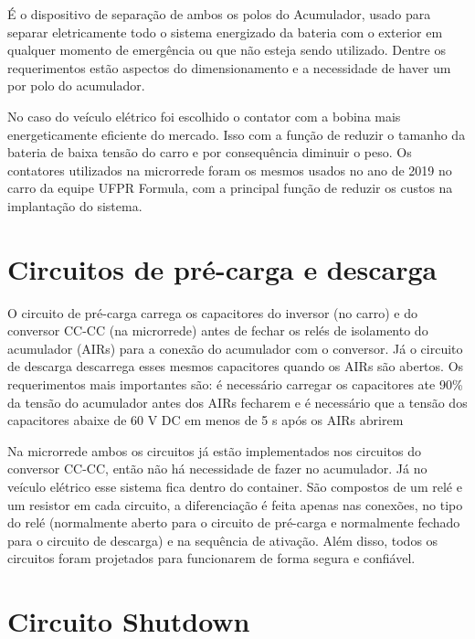     É o dispositivo de separação de ambos os polos do Acumulador, usado para separar eletricamente todo o sistema energizado da bateria com o exterior em qualquer momento de emergência ou que não esteja sendo utilizado. Dentre os requerimentos estão aspectos do dimensionamento e a necessidade de haver um por polo do acumulador.

    No caso do veículo elétrico foi escolhido o contator com a bobina mais energeticamente eficiente do mercado. Isso com a função de reduzir o tamanho da bateria de baixa tensão do carro e por consequência diminuir o peso. Os contatores utilizados na microrrede foram os mesmos usados no ano de 2019 no carro da equipe UFPR Formula, com a principal função de reduzir os custos na implantação do sistema.


\section{Circuitos de pré-carga e descarga}

    O circuito de pré-carga carrega os capacitores do inversor (no carro) e do conversor CC-CC (na microrrede) antes de fechar os relés de isolamento do acumulador (AIRs) para a conexão do acumulador com o conversor. Já o circuito de descarga descarrega esses mesmos capacitores quando os AIRs são abertos. Os requerimentos mais importantes são: é necessário carregar os capacitores ate 90\% da tensão do acumulador antes dos AIRs fecharem e é necessário que a tensão dos capacitores abaixe de 60 V DC em menos de 5 s após os AIRs abrirem

    Na microrrede ambos os circuitos já estão implementados nos circuitos do conversor CC-CC, então não há necessidade de fazer no acumulador. Já no veículo elétrico esse sistema fica dentro do container. São compostos de um relé e um resistor em cada circuito, a diferenciação é feita apenas nas conexões, no tipo do relé (normalmente aberto para o circuito de pré-carga e normalmente fechado para o circuito de descarga) e na sequência de ativação. Além disso, todos os circuitos foram projetados para funcionarem de forma segura e confiável.


\section{Circuito Shutdown}

